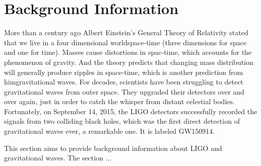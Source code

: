 \documentclass[aps,prd,preprint]{revtex4}
\begin{document}
\section{Background Information}
More than a century ago Albert Einstein's General Theory of Relativity stated that we live in a four dimensional world\textemdash space-time (three dimensions for space and one for time). Masses cause distortions in spac-time, which accounts for the phenomenon of gravity. And the theory predicts that changing mass distribution will generally produce ripples in space-time, which is another prediction from him\textemdash gravitational waves. \cite{relativity1,relativity2} For decades, scientists have been struggling to detect gravitational waves from outer space. They upgraded their detectors over and over again, just in order to catch the whisper from distant celestial bodies. Fortunately, on September 14, 2015, the LIGO detectors successfully recorded the signals from two colliding black holes, which was the first direct detection of gravitational waves ever, a remarkable one. \cite{O1} It is labeled GW150914.
\par This section aims to provide background information about LIGO and gravitational waves. The section ...
\end{document}
